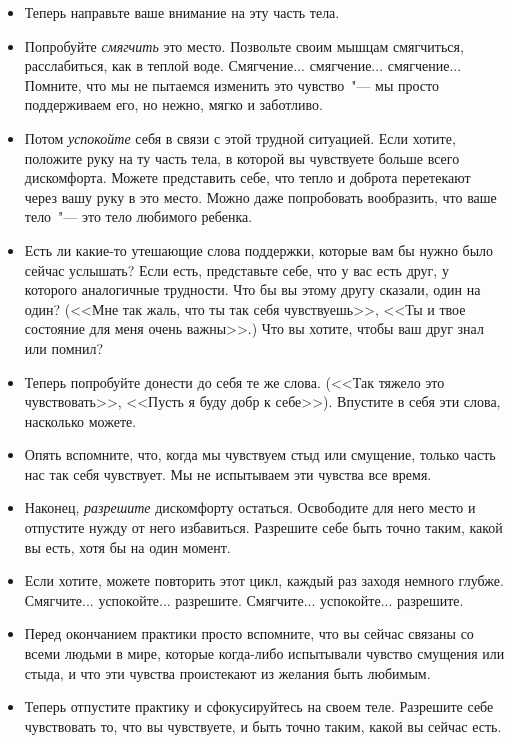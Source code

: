 \begin{itemize}
	\item Теперь направьте ваше внимание на эту часть тела.
	
	\item Попробуйте \emph{смягчить} это место. Позвольте своим мышцам смягчиться, расслабиться, как в теплой воде. Смягчение... смягчение... смягчение... Помните, что мы не пытаемся изменить это чувство~"--- мы просто поддерживаем его, но нежно, мягко и заботливо.
	
	\item Потом \emph{успокойте} себя в связи с этой трудной ситуацией. Если хотите, положите руку на ту часть тела, в которой вы чувствуете больше всего дискомфорта. Можете представить себе, что тепло и доброта перетекают через вашу руку в это место. Можно даже попробовать вообразить, что ваше тело~"--- это тело любимого ребенка.
	
	\item Есть ли какие-то утешающие слова поддержки, которые вам бы нужно было сейчас услышать? Если есть, представьте себе, что у вас есть друг, у которого аналогичные трудности. Что бы вы этому другу сказали, один на один? (<<Мне так жаль, что ты так себя чувствуешь>>, <<Ты и твое состояние для меня очень важны>>.) Что вы хотите, чтобы ваш друг знал или помнил?
	
	\item Теперь попробуйте донести до себя те же слова. (<<Так тяжело это чувствовать>>, <<Пусть я буду добр к себе>>). Впустите в себя эти слова, насколько можете.
	
	\item Опять вспомните, что, когда мы чувствуем стыд или смущение, только часть нас так себя чувствует. Мы не испытываем эти чувства все время.
	
	\item Наконец, \emph{разрешите} дискомфорту остаться. Освободите для него место и отпустите нужду от него избавиться. Разрешите себе быть точно таким, какой вы есть, хотя бы на один момент.
	
	\item Если хотите, можете повторить этот цикл, каждый раз заходя немного глубже. Смягчите... успокойте... разрешите. Смягчите... успокойте... разрешите.
	
	\item Перед окончанием практики просто вспомните, что вы сейчас связаны со всеми людьми в мире, которые когда-либо испытывали чувство смущения или стыда, и что эти чувства проистекают из желания быть любимым.
	
	\item Теперь отпустите практику и сфокусируйтесь на своем теле. Разрешите себе чувствовать то, что вы чувствуете, и быть точно таким, какой вы сейчас есть.
\end{itemize}

